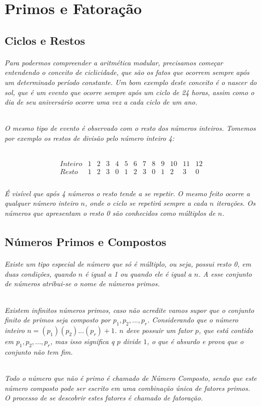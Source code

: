 \chapter {Primos e Fatora\c{c}\~ao}
\label{Num}

\section{Ciclos e Restos}	
\subparagraph{
Para podermos compreender a aritm\'etica modular, precisamos come\c{c}ar entendendo o conceito de ciclicidade, que s\~ao os fatos que ocorrem sempre ap\'os um determinado per\'iodo constante. Um bom exemplo deste conceito \'e o nascer do sol, que \'e um evento que ocorre sempre ap\'os um ciclo de {24} horas, assim como o dia de seu anivers\'ario ocorre uma vez a cada ciclo de um ano.
}
\subparagraph{
O mesmo tipo de evento \'e observado com o resto dos n\'umeros inteiros. Tomemos por exemplo os restos de divis\~ao pelo n\'umero inteiro {4}:
}

\[
\begin{array}{ccccccccccccc}
  {Inteiro} & 1 & 2 & 3 & 4 & 5 & 6 & 7 & 8 & 9 & 10 &  11 & 12 \\  
	{Resto} & 1 & 2 & 3 & 0 & 1 & 2 & 3 & 0 & 1 & 2  &  3 & 0 \\ 
\end{array}
\]

\subparagraph{
\'E vis\'ivel que ap\'os {4} n\'umeros o resto tende a se repetir. O mesmo feito ocorre a qualquer n\'umero inteiro $n$, onde o ciclo se repetir\'a sempre a cada $n$ itera\c{c}\~oes. Os n\'umeros que apresentam o resto {0} s\~ao conhecidos como m\'ultiplos de $n$.
}

\section{N\'{u}meros Primos e Compostos}

\subparagraph{
Existe um tipo especial de n\'umero que s\'o \'e m\'ultiplo, ou seja, possui resto {0}, em duas condi\c{c}\~oes, quando $n$ \'e igual a {1} ou quando ele \'e igual a $n$. A esse conjunto de n\'umeros atribui-se o nome de \textit{n\'umeros primos}.
}
\subparagraph{
Existem infinitos n\'umeros primos, caso n\~ao acredite vamos supor que o conjunto finito de primos seja composto por $p_{1},  p_{2}, ..., p_{r} $. Considerando que o n\'umero inteiro $n=(p_{1})(p_{2})...(p_{r}) + 1$. $n$ deve possuir um fator $p$, que est\'a contido em $p_{1},  p_{2}, ..., p_{r} $, mas isso significa q $p$ divide $1$, o que \'e absurdo e prova que o conjunto n\~ao tem fim.
}
\subparagraph{
Todo o n\'umero que n\~ao \'e primo \'e chamado de \textit{N\'umero Composto}, sendo que este n\'umero composto pode ser escrito em uma combina\c{c}\~ao \'unica de fatores primos. O processo de se descobrir estes fatores \'e chamado de \textit{fatora\c{c}\~ao}.
}

